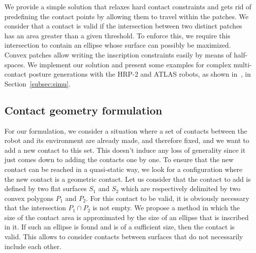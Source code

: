 We provide a simple solution that relaxes hard contact constraints and gets rid of predefining the contact points by allowing them to travel within the patches.
We consider that a contact is valid if the intersection between two distinct patches has an area greater than a given threshold.
To enforce this, we require this intersection to contain an ellipse whose surface can possibly be maximized.
Convex patches allow writing the inscription constraints easily by means of half-spaces.
We implement our solution and present some examples for complex multi-contact posture generations with the HRP-2 and ATLAS robots, as shown in~, in Section~\ref{subsec:simu}.



\subsection{Contact geometry formulation}
\label{subsec:contact_geometry_formulation}


For our formulation, we consider a situation where a set of contacts between the robot and its environment are already made, and therefore fixed, and we want to add a new contact to this set.
This doesn't induce any loss of generality since it just comes down to adding the contacts one by one.
To ensure that the new contact can be reached in a quasi-static way, we look for a configuration where the new contact is a geometric contact.
Let us consider that the contact to add is defined by two flat surfaces $S_1$ and $S_2$ which are respectively delimited by two convex polygons $P_1$ and $P_2$.
For this contact to be valid, it is obviously necessary that the intersection $P_1 \cap P_2$ is not empty.
We propose a method in which the size of the contact area is approximated by the size of an ellipse that is inscribed in it.
If such an ellipse is found and is of a sufficient size, then the contact is valid.
This allows to consider contacts between surfaces that do not necessarily include each other.

